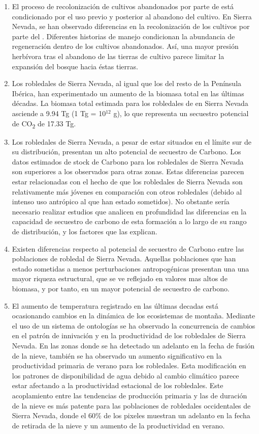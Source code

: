 \begin{enumerate}
    \item El proceso de recolonización de cultivos abandonados por parte de \Qp está condicionado por el uso previo y posterior al abandono del cultivo. En Sierra Nevada, se han observado diferencias en la recolonización de los cultivos por parte del \Qp. Diferentes historias de manejo condicionan la abundancia de regeneración dentro de los cultivos abandonados. Así, una mayor presión herbívora tras el abandono de las tierras de cultivo parece limitar la expansión del bosque hacia éstas tierras.
    
    \item Los robledales de Sierra Nevada, al igual que los del resto de la Península Ibérica, han experimentado un aumento de la biomasa total en las últimas décadas. La biomasa total estimada para los robledales de \Qp en Sierra Nevada asciende a 9.94 Tg (1 Tg = 10$^12$ g), lo que representa un secuestro potencial de CO\textsubscript{2} de 17.33 Tg. 
    
    \item Los robledales de Sierra Nevada, a pesar de estar situados en el límite sur de su distribución, presentan un alto potencial de secuestro de Carbono. Los datos estimados de stock de Carbono para los robledales de Sierra Nevada son superiores a los observados para otras zonas. Estas diferencias parecen estar relacionadas con el hecho de que los robledales de Sierra Nevada son relativamente más jóvenes en comparación con otros robledales (debido al intenso uso antrópico al que han estado sometidos). No obstante sería necesario realizar estudios que analicen en profundidad las diferencias en la capacidad de secuestro de carbono de esta formación a lo largo de su rango de distribución, y los factores que las explican. 
    
    \item Existen diferencias respecto al potencial de secuestro de Carbono entre las poblaciones de robledal de Sierra Nevada. Aquellas poblaciones que han estado sometidas a menos perturbaciones antropogénicas presentan una una mayor riqueza estructural, que se ve reflejado en valores mas altos de biomasa, y por tanto, en un mayor potencial de secuestro de carbono. 

    \item El aumento de temperatura registrado en las últimas decadas está ocasionando cambios en la dinámica de los ecosistemas de montaña. Mediante el uso de un sistema de ontologías se ha observado la concurrencia de cambios en el patrón de innivación y en la productividad de los robledales de Sierra Nevada. En las zonas donde se ha detectado un adelanto en la fecha de fusión de la nieve, también se ha observado un aumento significativo en la productividad primaria de verano para los robledales. Esta modificación en los patrones de disponibilidad de agua debido al cambio climático parece estar afectando a la productividad estacional de los robledales. Este acoplamiento entre las tendencias de producción primaria y las de duración de la nieve es más patente para las poblaciones de robledales occidentales de Sierra Nevada, donde el 60\% de los pixeles muestran un adelanto en la fecha de retirada de la nieve y un aumento de la productividad en verano. 
    

\end{enumerate}

